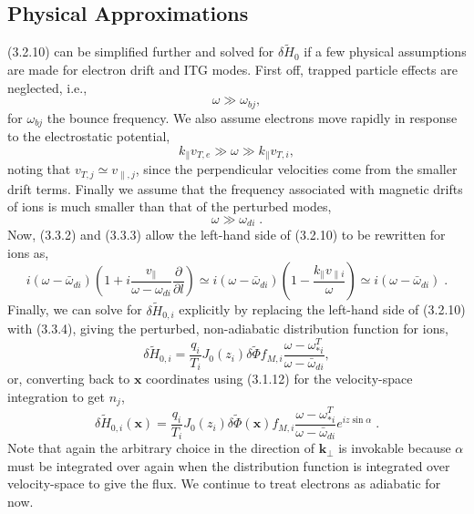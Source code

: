 \documentclass[12pt]{article}
\numberwithin{equation}{subsection}
\begin{document}
\subsection{Physical Approximations}
   \quad (3.2.10) can be simplified further and solved for $\delta\widetilde{H}_0$ if a few physical assumptions are made for electron drift and ITG modes.
First off, trapped particle effects are neglected, i.e.,
   \begin{equation}
      \omega \gg \omega_{bj},
   \end{equation}
for $\omega_{bj}$ the bounce frequency. We also assume electrons move rapidly in response to the electrostatic potential,
   \begin{equation}
      k_\parallel v_{T,e} \gg \omega \gg k_\parallel v_{T,i},
   \end{equation}
noting that $v_{T,j} \simeq v_{\parallel,j}$, since the perpendicular velocities come from the smaller drift terms. Finally we assume that the frequency
associated with magnetic drifts of ions is much smaller than that of the perturbed modes,
   \begin{equation}
      \omega \gg \omega_{di}\;.
   \end{equation}
Now, (3.3.2) and (3.3.3) allow the left-hand side of (3.2.10) to be rewritten for ions as,
   \begin{equation}
      i(\omega-\bar{\omega}_{di})(1+i\frac{v_\parallel}{\omega-\omega_{di}}\frac{\partial}{\partial l}) \simeq
      i(\omega-\bar{\omega}_{di})(1-\frac{k_\parallel v_{\parallel i}}{\omega}) \simeq i(\omega-\bar{\omega}_{di})\;.
   \end{equation}
Finally, we can solve for $\delta\widetilde{H}_{0,i}$ explicitly by replacing the left-hand side of (3.2.10) with (3.3.4), giving
the perturbed, non-adiabatic distribution function for ions,
   \begin{equation}
      \delta\widetilde{H}_{0,i} = \frac{q_i}{T_i}J_0(z_i)\delta\widetilde{\Phi}
                                      f_{M,i}\frac{\omega-\omega_{*i}^T}{\omega-\bar{\omega}_{di}},
   \end{equation}
or, converting back to $\bm{x}$ coordinates using (3.1.12) for the velocity-space integration to get $n_j$,
   \begin{equation}
      \delta\widetilde{H}_{0,i}(\bm{x}) = \frac{q_i}{T_i}J_0(z_i)\delta\widetilde{\Phi}(\bm{x})
                                      f_{M,i}\frac{\omega-\omega_{*i}^T}{\omega-\bar{\omega}_{di}}e^{iz\sin\alpha}\;.
   \end{equation}
Note that again the arbitrary choice in the direction of $\bm{k}_\perp$ is invokable because $\alpha$ must be
integrated over again when the distribution function is integrated over velocity-space to give the flux. We continue
to treat electrons as adiabatic for now.
\end{document}
